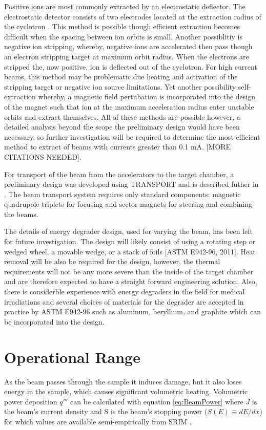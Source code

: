 \documentclass[final,3p,times,twocolumn]{elsarticle} %
\begin{document}
Positive ions are most commonly extracted by an electrostatic deflector. The electrostatic detector consists of two electrodes located at the extraction radius of the cyclotron \cite{strijckmans2001isochronous}.  This method is possible though efficient extraction becomes difficult when the spacing between ion orbits is small.  Another possiblitiy is negative ion stripping, whereby, negative ions are accelerated then pass though an electron stripping target at maximum orbit radius.  When the electrons are stripped the, now positive, ion is deflected out of the cyclotron.  For high current beams, this method may be problematic due heating and activation of the stripping target or negative ion source limitations. Yet another possibility self-extraction whereby, a magnetic field pertubation is incorporated into the design of the magnet such that ion at the maximum acceleration radius enter unstable orbits and extract themselves.  All of these methods are possible however, a detailed analysis beyond the scope the preliminary design would have been necessary, so further investigation will be required to determine the most efficient method to extract of beams with currents greater than 0.1 mA. [MORE CITATIONS NEEDED].

For transport of the beam from the accelerators to the target chamber, a preliminary design was developed using TRANSPORT \cite{brown1973computer} and is described futher in \cite{sordelet2011design}.  The beam transport system requires only standard components: magnetic quadrupole triplets for focusing and sector magnets for steering and combining the beams.

The details of energy degrader design, used for varying the beam, has been left for future investigation.  The design will likely consist of using a rotating
step or wedged wheel, a movable wedge, or a stack of foils [ASTM E942-96, 2011]. Heat removal will be also be required for the design, however, the thermal requirements will not be any more severe than the inside of the target chamber and are therefore expected to have a straight forward engineering solution. Also, there is considerble experience with energy degraders in the field for medical irradiations and several choices of materials for the degrader are accepted in practice by ASTM E942-96 such as aluminum, beryllium, and graphite which can be incorporated into the design.

\section{Operational Range} 
\label{sec:OperatingConstraints}
As the beam passes through the sample it induces damage, but it also loses energy in the sample, which causes significant volumetric heating.  Volumetric power deposition $q'''$ can be calculated with equation \ref{eq:BeamPower} where $J$ is the beam's current density and S is the beam's stopping power ($S(E) \equiv dE/dx$) for which values are available semi-empirically from SRIM \cite{SRIM}.
\end{document}
